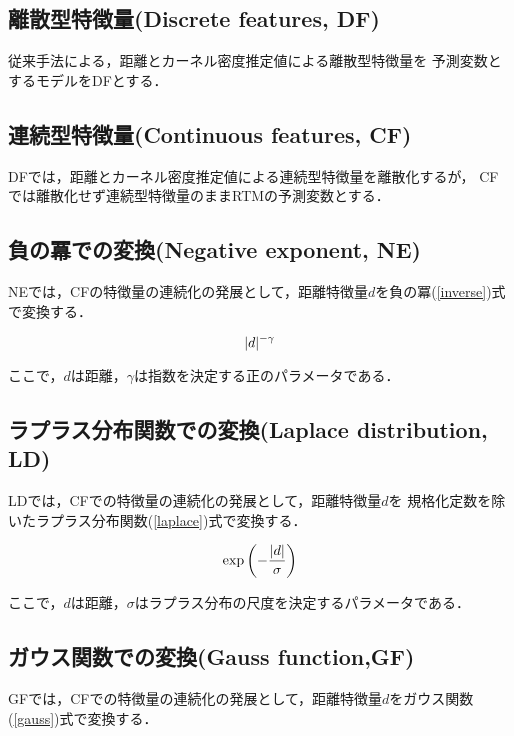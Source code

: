 \subsection{離散型特徴量(Discrete features, DF)}
従来手法\citep{caplan2015risk}による，距離とカーネル密度推定値による離散型特徴量を
予測変数とするモデルをDFとする．
\subsection{連続型特徴量(Continuous features, CF)}
DFでは，距離とカーネル密度推定値による連続型特徴量を離散化するが，
CFでは離散化せず連続型特徴量のままRTMの予測変数とする．

\subsection{負の冪での変換(Negative exponent, NE)}
NEでは，CFの特徴量の連続化の発展として，距離特徴量$d$を負の冪(\ref{inverse})式で変換する．

\begin{equation}\label{inverse}
  \lvert d\rvert^{-\gamma}
\end{equation}

ここで，$d$は距離，$\gamma$は指数を決定する正のパラメータである．

\subsection{ラプラス分布関数での変換(Laplace distribution, LD)}
LDでは，CFでの特徴量の連続化の発展として，距離特徴量$d$を
規格化定数を除いたラプラス分布関数(\ref{laplace})式で変換する．

\begin{equation}\label{laplace}
  \exp \left( -\frac{\lvert d\rvert}{\sigma}\right)
\end{equation}

ここで，$d$は距離，$\sigma$はラプラス分布の尺度を決定するパラメータである．


\subsection{ガウス関数での変換(Gauss function,GF)}
GFでは，CFでの特徴量の連続化の発展として，距離特徴量$d$をガウス関数(\ref{gauss})式で変換する．

